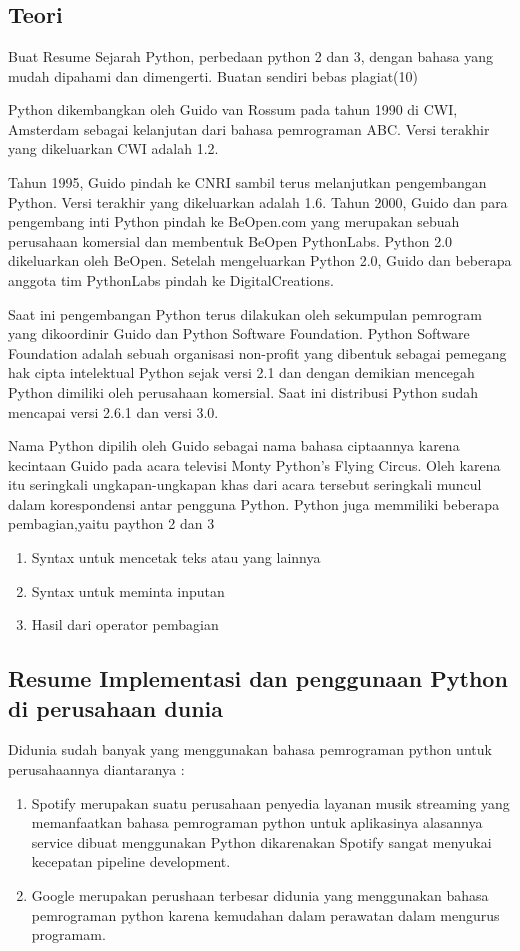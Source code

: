 \chapter{}

\section{Teori}
 Buat Resume Sejarah Python, perbedaan python 2 dan 3, dengan bahasa yang mudah dipahami dan dimengerti. Buatan sendiri bebas plagiat(10)
 
 Python dikembangkan oleh Guido van Rossum pada tahun 1990 di CWI, Amsterdam sebagai kelanjutan dari bahasa pemrograman ABC. Versi terakhir yang dikeluarkan CWI adalah 1.2.

Tahun 1995, Guido pindah ke CNRI sambil terus melanjutkan pengembangan Python. Versi terakhir yang dikeluarkan adalah 1.6. Tahun 2000, Guido dan para pengembang inti Python pindah ke BeOpen.com yang merupakan sebuah perusahaan komersial dan membentuk BeOpen PythonLabs. Python 2.0 dikeluarkan oleh BeOpen. Setelah mengeluarkan Python 2.0, Guido dan beberapa anggota tim PythonLabs pindah ke DigitalCreations.

Saat ini pengembangan Python terus dilakukan oleh sekumpulan pemrogram yang dikoordinir Guido dan Python Software Foundation. Python Software Foundation adalah sebuah organisasi non-profit yang dibentuk sebagai pemegang hak cipta intelektual Python sejak versi 2.1 dan dengan demikian mencegah Python dimiliki oleh perusahaan komersial. Saat ini distribusi Python sudah mencapai versi 2.6.1 dan versi 3.0.

Nama Python dipilih oleh Guido sebagai nama bahasa ciptaannya karena kecintaan Guido pada acara televisi Monty Python's Flying Circus. Oleh karena itu seringkali ungkapan-ungkapan khas dari acara tersebut seringkali muncul dalam korespondensi antar pengguna Python.
Python juga memmiliki beberapa pembagian,yaitu paython 2 dan 3
\begin{enumerate}
    \item Syntax untuk mencetak teks atau yang lainnya
    \item Syntax untuk meminta inputan
    \item Hasil dari operator pembagian
\end{enumerate}
\section{Resume Implementasi dan penggunaan Python di perusahaan dunia}
Didunia sudah banyak yang menggunakan bahasa pemrograman python untuk perusahaannya diantaranya :
\begin{enumerate}
    \item 
    Spotify merupakan suatu perusahaan penyedia layanan musik streaming yang memanfaatkan bahasa pemrograman python untuk aplikasinya alasannya  service dibuat menggunakan Python dikarenakan Spotify sangat menyukai kecepatan pipeline development.
    \item
    Google merupakan perushaan terbesar didunia yang menggunakan bahasa pemrograman python karena  kemudahan dalam perawatan dalam mengurus programam.
\end{enumerate}

